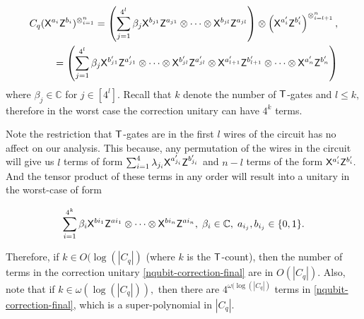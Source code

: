 
\begin{equation}
\label{nqubit:eq9}
\begin{aligned}
C_q ({\sf X}^{a_{i}}{\sf Z}^{b_{i}})^{\otimes_{i=1}^{n}}=\left(\sum_{j=1}^{4^l} \beta_j {\sf X}^{b_{j1}}{\sf Z}^{a_{j1}} \otimes \cdots \otimes{\sf X}^{b_{jl}}{\sf Z}^{a_{jl}}\right) \otimes \left({\sf X}^{a_{i}^\prime}{\sf Z}^{b_{i}^\prime}\right)^{\otimes_{i=l+1}^{n}}, \\
 =\left(\sum_{j=1}^{4^{l}} \beta_j {\sf X}^{b_{j1}^\prime}{\sf Z}^{a_{j1}^\prime} \otimes \cdots \otimes{\sf X}^{b_{jl}^\prime}{\sf Z}^{a_{jl}^\prime} \otimes {\sf X}^{a_{l+1}^\prime}{\sf Z}^{b_{l+1}^\prime}  \otimes \cdots   \otimes{\sf X}^{a_{n}^\prime}{\sf Z}^{b_{n}^\prime}\right)
 \end{aligned}
\end{equation}
where $\beta_j\in \mathbb{C}$ for $j\in[4^l].$  Recall that $k$ denote the number of ${\sf T}$-gates and $l\leq k,$ therefore in the worst case the correction unitary can have $4^k$ terms. 

\begin{remark}
\label{remark:nqubit-correction1}
Note the restriction that ${\sf T}$-gates are in the first $l$ wires of the circuit has no affect on our analysis. This because, any permutation of the wires in the circuit will give us $l$ terms of form $\sum_{i=1}^4 \lambda_{j_i} {\sf X}^{a_{j_i}^\prime} {\sf Z}^{b_{j_i}^\prime}$ and $n-l$ terms of the form ${\sf X}^{a_{i}^\prime} {\sf Z}^{b_{i}^\prime}.$  And the tensor product of these terms in any order will result into a unitary in the worst-case of form
\end{remark}

\begin{equation}
\label{nqubit-correction-final}
\sum_{i=1}^{4^k} \beta_i {\sf X}^{b{i_1}} {\sf Z}^{a{i_1}}\otimes \cdots \otimes {\sf X}^{b{i_n}} {\sf Z}^{a{i_n}},\; \beta_i\in\mathbb{C},\; a_{i_j},b_{i_j}\in\{0,1\}.
\end{equation}

Therefore, if $k\in O(\log(|C_q|)$ (where $k$ is the ${\sf T}$-count), then the number of terms in the correction unitary \ref{nqubit-correction-final} are in $O(|C_q|).$ Also, note that if $k\in \omega(\log(|C_q|)),$ then there are $4^{\omega(\log(|C_q|)}$  terms in \ref{nqubit-correction-final}, which is a super-polynomial in $|C_q|.$ 




